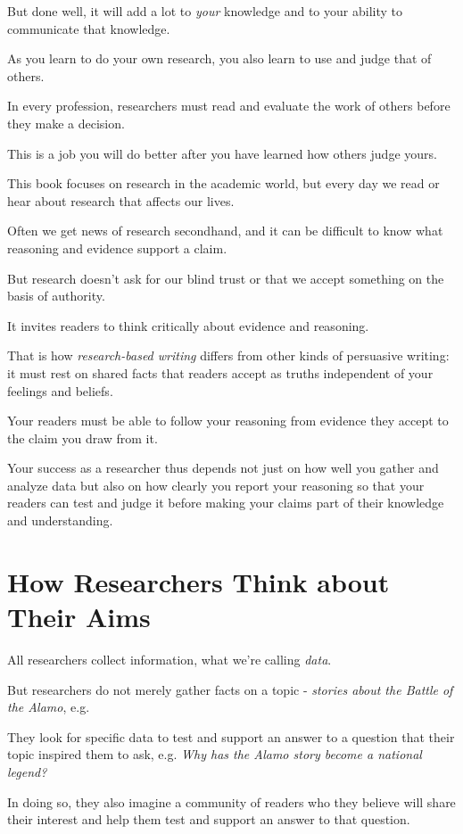 \documentclass[oneside]{book}
\numberwithin{equation}{section}
\begin{document}
But done well, it will add a lot to \textit{your} knowledge and to your ability to communicate that knowledge.

As you learn to do your own research, you also learn to use and judge that of others.

In every profession, researchers must read and evaluate the work of others before they make a decision.

This is a job you will do better after you have learned how others judge yours.

%
This book focuses on research in the academic world, but every day we read or hear about research that affects our lives.

Often we get news of research secondhand, and it can be difficult to know what reasoning and evidence support a claim.

But research doesn't ask for our blind trust or that we accept something on the basis of authority.

It invites readers to think critically about evidence and reasoning.

%
That is how \textit{research-based writing} differs from other kinds of persuasive writing: it must rest on shared facts that readers accept as truths independent of your feelings and beliefs.

Your readers must be able to follow your reasoning from evidence they accept to the claim you draw from it.

Your success as a researcher thus depends not just on how well you gather and analyze data but also on how clearly you report your reasoning so that your readers can test and judge it before making your claims part of their knowledge and understanding.

\section{How Researchers Think about Their Aims}
All researchers collect information, what we're calling \textit{data}.

But researchers do not merely gather facts on a topic - \textit{stories about the Battle of the Alamo}, e.g.

They look for specific data to test and support an answer to a question that their topic inspired them to ask, e.g. \textit{Why has the Alamo story become a national legend?}

In doing so, they also imagine a community of readers who they believe will share their interest and help them test and support an answer to that question.
\end{document}
